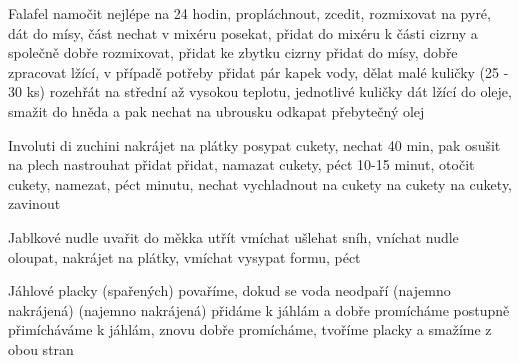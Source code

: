 \documentclass[12pt,a4paper]{article}
\begin{document}
\begin{recipe}{Falafel}
   namočit nejlépe na 24 hodin, propláchnout, zcedit, rozmixovat na pyré, dát do mísy, část nechat v mixéru
   posekat, přidat do mixéru k části cizrny a společně dobře rozmixovat, přidat ke zbytku cizrny
   přidat do mísy, dobře zpracovat lžící, v případě potřeby přidat pár kapek vody, dělat malé kuličky  (25 - 30 ks)
   rozehřát na střední až vysokou teplotu, jednotlivé kuličky dát lžící do oleje, smažit do hněda a pak nechat na ubrousku odkapat přebytečný olej
\end{recipe}
\newpage

\begin{recipe}{Involuti di zuchini}
   nakrájet na plátky
   posypat cukety, nechat 40 min, pak osušit
   na plech
   nastrouhat
   přidat
   přidat, namazat cukety, péct 10-15 minut, otočit cukety, namezat, péct minutu, nechat vychladnout
   na cukety
   na cukety
   na cukety, zavinout
\end{recipe}
\newpage

\begin{recipe}{Jablkové nudle}
   uvařit do měkka
   utřít
   vmíchat
   ušlehat sníh, vníchat nudle
   oloupat, nakrájet na plátky, vmí\-chat
   vysypat formu, péct
\end{recipe}
\newpage

\begin{recipe}{Jáhlové placky}
   (spařených)
   povaříme, dokud se voda neodpaří
   (najemno nakrájená)
   (najemno nakrájená)
   přidáme k jáhlám a dobře promícháme
   postupně přimícháváme k jáhlám, znovu dobře promícháme, tvoříme placky a smažíme z obou stran
\end{recipe}
\newpage
\end{document}
